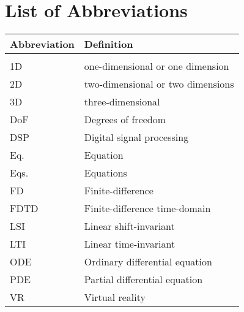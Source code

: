 \chapter*{List of Abbreviations}
{\centering\renewcommand{\arraystretch}{1.1}
\begin{longtable}{ p{3cm} p{8cm}}
 Abbreviation & Definition\\
 \hline\\
 \endhead
 1D & one-dimensional or one dimension\\
 2D & two-dimensional or two dimensions\\
 3D & three-dimensional \\
 DoF & Degrees of freedom \\
 DSP & Digital signal processing \\
 Eq. & Equation \\
 Eqs. & Equations\\
 FD & Finite-difference\\
 FDTD & Finite-difference time-domain\\
 LSI & Linear shift-invariant\\
 LTI & Linear time-invariant\\
 ODE & Ordinary differential equation\\
 PDE & Partial differential equation\\
 VR & Virtual reality
\end{longtable}}